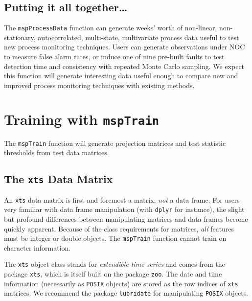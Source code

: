 \documentclass{report}\usepackage[]{graphicx}\usepackage[]{color}
\begin{document}
\subsection{Putting it all together\ldots}
The \texttt{mspProcessData} function can generate weeks' worth of non-linear, non-stationary, autocorrelated, multi-state, multivariate process data useful to test new process monitoring techniques. Users can generate observations under NOC to measure false alarm rates, or induce one of nine pre-built faults to test detection time and consistency with repeated Monte Carlo sampling. We expect this function will generate interesting data useful enough to compare new and improved process monitoring techniques with existing methods.




\section{Training with \texttt{mspTrain}} \label{sec:D_Train}

The \texttt{mspTrain} function will generate projection matrices and test statistic thresholds from test data matrices.


\subsection{The \texttt{xts} Data Matrix}
An \texttt{xts} data matrix is first and foremost a matrix, \emph{not} a data frame. For users very familiar with data frame manipulation (with \texttt{dplyr} for instance), the slight but profound differences between manipulating matrices and data frames become quickly apparent. Because of the class requirements for matrices, \emph{all} features must be integer or double objects. The \texttt{mspTrain} function cannot train on character information.

The \texttt{xts} object class stands for \emph{extendible time series} and comes from the package \texttt{xts}, which is itself built on the package \texttt{zoo}. The date and time information (necessarily as \texttt{POSIX} objects) are stored as the row indices of \texttt{xts} matrices. We recommend the package \texttt{lubridate} for manipulating \texttt{POSIX} objects.
\end{document}
